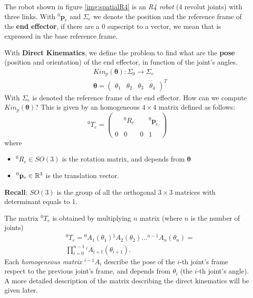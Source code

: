 \documentclass[10pt, letterpaper]{report}
\begin{document}
The robot shown in figure \ref{img:spatialR4} is an \textit{R4 robot} (4 revolut joints) with three links. With ${}^0\mathbf p_e$ and $\Sigma_e$ we denote the position and the reference frame of the \textbf{end effector}, if there are a 0 supscript to a vector, we mean that is expressed in the base reference frame.\bigskip

With \textbf{Direct Kinematics}, we define the problem to find what are the \textbf{pose} (position and orientation) of the end effector, in function of the joint's angles. \begin{align}
    &Kin_p(\boldsymbol{\theta}):\Sigma_0\rightarrow\Sigma_e\\
    &\boldsymbol{\theta}=\begin{pmatrix}
        \theta_1&\theta_2&\theta_3&\theta_4
    \end{pmatrix}^T
\end{align}
With $\Sigma_e$ is denoted the reference frame of the end effector. How can we compute $Kin_p(\boldsymbol{\theta})$? This is given by an homogeneous $4\times 4$ matrix defined as follows:\begin{equation}
    {}^0T_e=\begin{pmatrix}
        & & & \\
        & {}^0R_e & &{}^0\mathbf p_e \\
        & & & \\
        0& 0&0 &1 
    \end{pmatrix}
\end{equation}
where\begin{itemize}
    \item ${}^0R_e\in SO(3)$ is the rotation matrix, and depends from $\boldsymbol{\theta}$
    \item ${}^0\mathbf p_e\in {\mathbb R}^3$ is the translation vector.
\end{itemize}

\noindent\textbf{Recall}: $SO(3)$ is the group of all the orthogonal $3\times 3$ matrices with determinant equals to 1.\bigskip

\noindent The matrix ${}^0T_e$ is obtained by multiplying $n$ matrix (where $n$ is the number of joints)\begin{align}
     &{}^0T_e= {}^0A_1(\theta_1) {}^1A_2(\theta_2)\dots {}^{n-1}A_n(\theta_n)=\\&\prod_{i=0}^{n-1}{}^iA_{i+1}(\theta_{i+1}).
\end{align}
Each \textit{homogeneous matrix} $^{i-1}A_i$ describe the pose of the $i$-th joint's frame respect to the previous joint's frame, and depends from $\theta_i$ (the $i$-th joint's angle). A more detailed description of the matrix describing the direct kinematics will be given later.\bigskip
\end{document}
